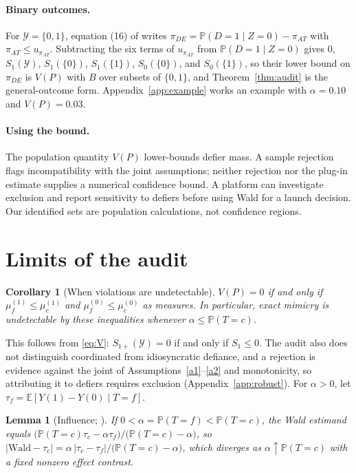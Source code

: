 \documentclass{article}
\newtheorem{corollary}[theorem]{Corollary}
\newtheorem{lemma}[theorem]{Lemma}
\theoremstyle{remark}
\newcommand{\Prob}{\mathbb{P}}
\newcommand{\E}{\mathbb{E}}
\newcommand{\Yspace}{\mathcal{Y}}
\newcommand{\Wald}{\mathrm{Wald}}
\begin{document}
\paragraph{Binary outcomes.} For $\Yspace=\{0,1\}$, equation (16) of
\citet{richardson2010binary} writes $\pi_{DE}=\Prob(D{=}1\mid Z{=}0)-\pi_{AT}$
with $\pi_{AT}\le u_{\pi_{AT}}$. Subtracting the six terms of $u_{\pi_{AT}}$
from $\Prob(D{=}1\mid Z{=}0)$ gives $0$, $S_1(\Yspace)$, $S_1(\{0\})$,
$S_1(\{1\})$, $S_0(\{0\})$, and $S_0(\{1\})$, so their lower bound on
$\pi_{DE}$ is $V(P)$ with $B$ over subsets of $\{0,1\}$, and
Theorem~\ref{thm:audit} is the general-outcome form. Appendix~\ref{app:example}
works an example with $\alpha=0.10$ and $V(P)=0.03$.

\paragraph{Using the bound.} The population quantity $V(P)$ lower-bounds defier
mass. A sample rejection flags incompatibility with the joint assumptions;
neither rejection nor the plug-in estimate supplies a numerical confidence
bound. A platform can investigate exclusion and report sensitivity to defiers
before using Wald for a launch decision. Our identified sets are population
calculations, not confidence regions.

\section{Limits of the audit}\label{sec:limits}

\begin{corollary}[When violations are undetectable]\label{prop:stealth}
$V(P)=0$ if and only if $\mu_f^{(1)}\le\mu_c^{(1)}$ and $\mu_f^{(0)}\le\mu_c^{(0)}$ as measures. In particular, exact mimicry is undetectable by these inequalities whenever $\alpha\le\Prob(T=c)$.
\end{corollary}

This follows from \eqref{eq:V}: $S_{1+}(\Yspace)=0$ if and only if $S_1\le0$.
The audit also does not distinguish coordinated from idiosyncratic defiance,
and a rejection is evidence against the joint of Assumptions~\ref{a1}--\ref{a2}
and monotonicity, so attributing it to defiers requires exclusion
(Appendix~\ref{app:robust}). For $\alpha>0$, let
$\tau_f=\E[Y(1)-Y(0)\mid T=f]$.

\begin{lemma}[Influence; \citealp{angrist1996,noack2021sensitivity}]\label{lem:influence}
If $0<\alpha=\Prob(T=f)<\Prob(T=c)$, the Wald estimand equals
$\big(\Prob(T{=}c)\tau_c-\alpha\tau_f\big)/\big(\Prob(T{=}c)-\alpha\big)$, so
$|\Wald-\tau_c|=\alpha\,|\tau_c-\tau_f|/\big(\Prob(T{=}c)-\alpha\big)$, which
diverges as $\alpha\uparrow\Prob(T=c)$ with a fixed nonzero effect contrast.
\end{lemma}
\end{document}
